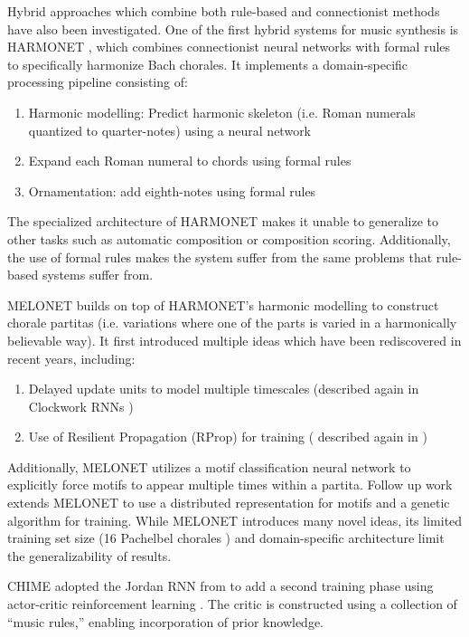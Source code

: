 Hybrid approaches which combine both rule-based and connectionist methods have
also been investigated. One of the first hybrid systems for music synthesis is
HARMONET \citep{hild1991harmonet}, which combines connectionist neural networks
with formal rules to specifically harmonize Bach chorales. It implements a
domain-specific processing pipeline consisting of:
\begin{enumerate}
  \item Harmonic modelling: Predict harmonic skeleton (i.e. Roman numerals
  quantized to quarter-notes) using a neural network
  \item Expand each Roman numeral to chords using formal rules
  \item Ornamentation: add eighth-notes using formal rules
\end{enumerate}
The specialized architecture of HARMONET makes it unable to generalize
to other tasks such as automatic composition or composition scoring.
Additionally, the use of formal rules makes the system suffer from the same
problems that rule-based systems suffer from.

MELONET \citep{feulner1994melonet} builds on top of HARMONET's harmonic
modelling to construct chorale partitas (i.e. variations where one of the
parts is varied in a harmonically believable way). It first introduced multiple
ideas which have been rediscovered in recent years, including:
\begin{enumerate}
  \item Delayed update units to model multiple timescales (described again in Clockwork
  RNNs \citep{Koutnik2014})
  \item Use of Resilient Propagation (RProp) \citep{riedmiller1993direct} for training (
  described again in \citep{Liu2014})
\end{enumerate}
Additionally, MELONET utilizes a motif classification neural network to
explicitly force motifs to appear multiple times within a partita.
Follow up work \citep{hornel1996learning} extends MELONET to use a distributed
representation for motifs and a genetic algorithm for training.
While MELONET introduces many novel ideas, its limited training set size
(16 Pachelbel chorales \citep{hornel1997melonet}) and domain-specific
architecture limit the generalizability of results. 

CHIME \citep{franklin2001learning} adopted the Jordan RNN from
\citep{todd1989connectionist} to add a second training phase using actor-critic
reinforcement learning \citep{sutton1998reinforcement}. The critic is
constructed using a collection of ``music rules,'' enabling incorporation of
prior knowledge.

